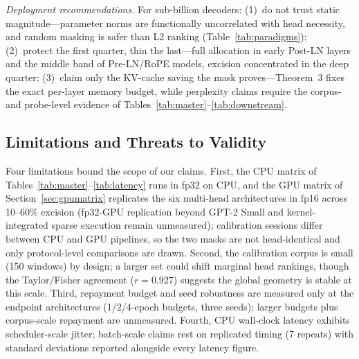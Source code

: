 \documentclass[10pt,journal,compsoc]{IEEEtran}
\begin{document}
\emph{Deployment recommendations.} For sub-billion decoders: (1)~do not trust
static magnitude---parameter norms are functionally uncorrelated with head necessity,
and random masking is safer than L2 ranking (Table~\ref{tab:paradigms});
(2)~protect the first quarter, thin the last---full allocation in early Post-LN
layers and the middle band of Pre-LN/RoPE models, excision concentrated in the
deep quarter; (3)~claim only the KV-cache saving the mask proves---Theorem~3
fixes the exact per-layer memory budget, while perplexity claims require the
corpus- and probe-level evidence of Tables~\ref{tab:master}--\ref{tab:downstream}.

\subsection{Limitations and Threats to Validity}
Four limitations bound the scope of our claims. First, the CPU matrix of
Tables~\ref{tab:master}--\ref{tab:latency} runs in fp32 on CPU, and the GPU
matrix of Section~\ref{sec:gpumatrix} replicates the six multi-head
architectures in fp16 across 10--60\% excision (fp32-GPU replication beyond
GPT-2 Small and kernel-integrated sparse execution remain unmeasured);
calibration sessions differ between CPU and GPU pipelines, so the
two masks are not head-identical and only protocol-level comparisons are
drawn. Second, the calibration corpus is small (150 windows) by design; a larger set
could shift marginal head rankings, though the Taylor/Fisher agreement
($r=0.927$) suggests the global geometry is stable at this scale. Third, repayment budget
and seed robustness are measured only at the endpoint architectures (1/2/4-epoch
budgets, three seeds); larger budgets plus corpus-scale repayment are unmeasured.
Fourth, CPU wall-clock latency exhibits
scheduler-scale jitter; batch-scale claims rest on replicated timing (7
repeats) with standard deviations reported alongside every latency figure.
\end{document}
